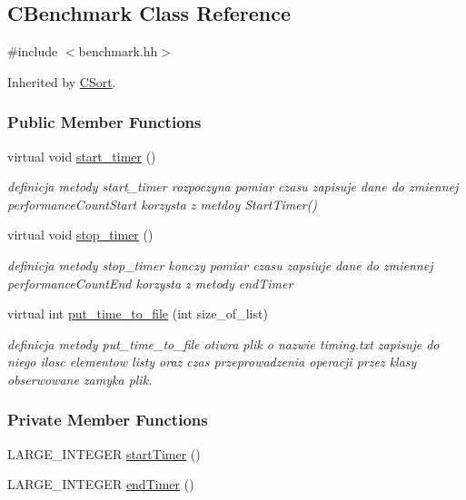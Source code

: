 \hypertarget{class_c_benchmark}{}\subsection{C\+Benchmark Class Reference}
\label{class_c_benchmark}


{\ttfamily \#include $<$benchmark.\+hh$>$}



Inherited by \hyperlink{class_c_sort}{C\+Sort}.

\subsubsection*{Public Member Functions}
\begin{DoxyCompactItemize}
\item 
virtual void \hyperlink{class_c_benchmark_aa6f22bf0b316b51db8f439c7420a1666}{start\+\_\+timer} ()
\begin{DoxyCompactList}\small\item\em definicja metody start\+\_\+timer rozpoczyna pomiar czasu zapisuje dane do zmiennej performance\+Count\+Start korzysta z metdoy Start\+Timer() \end{DoxyCompactList}\item 
virtual void \hyperlink{class_c_benchmark_a945aaa453776cd11395166b470d11778}{stop\+\_\+timer} ()
\begin{DoxyCompactList}\small\item\em definicja metody stop\+\_\+timer konczy pomiar czasu zapsiuje dane do zmiennej performance\+Count\+End korzysta z metody end\+Timer \end{DoxyCompactList}\item 
virtual int \hyperlink{class_c_benchmark_acb3046f4f9fdff7c17c7633baf41cf36}{put\+\_\+time\+\_\+to\+\_\+file} (int size\+\_\+of\+\_\+list)
\begin{DoxyCompactList}\small\item\em definicja metody put\+\_\+time\+\_\+to\+\_\+file otiwra plik o nazwie \textquotesingle{}timing.\+txt\textquotesingle{} zapisuje do niego ilosc elementow listy oraz czas przeprowadzenia operacji przez klasy obserwowane zamyka plik. \end{DoxyCompactList}\end{DoxyCompactItemize}
\subsubsection*{Private Member Functions}
\begin{DoxyCompactItemize}
\item 
L\+A\+R\+G\+E\+\_\+\+I\+N\+T\+E\+G\+E\+R \hyperlink{class_c_benchmark_a43dd8d9d01499e28f1dc899ea6f3ed97}{start\+Timer} ()
\item 
L\+A\+R\+G\+E\+\_\+\+I\+N\+T\+E\+G\+E\+R \hyperlink{class_c_benchmark_aab174262b346c522bdbc1df87ed93532}{end\+Timer} ()
\end{DoxyCompactItemize}
